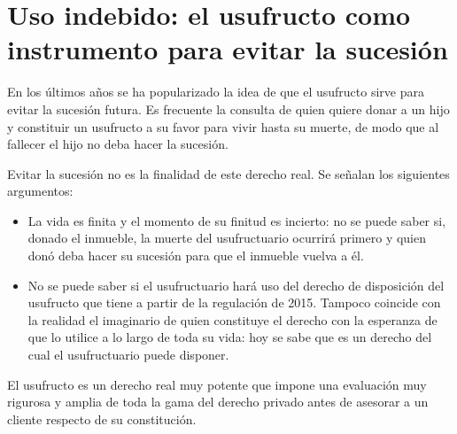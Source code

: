 \documentclass[12pt,oneside]{book}
\begin{document}
\section{Uso indebido: el usufructo como instrumento para evitar la sucesión}

En los últimos años se ha popularizado la idea de que el usufructo sirve para evitar la sucesión futura. Es frecuente la consulta de quien quiere donar a un hijo y constituir un usufructo a su favor para vivir hasta su muerte, de modo que al fallecer el hijo no deba hacer la sucesión.

Evitar la sucesión no es la finalidad de este derecho real. Se señalan los siguientes argumentos:

\begin{itemize}
    \item La vida es finita y el momento de su finitud es incierto: no se puede saber si, donado el inmueble, la muerte del usufructuario ocurrirá primero y quien donó deba hacer su sucesión para que el inmueble vuelva a él.
    \item No se puede saber si el usufructuario hará uso del derecho de disposición del usufructo que tiene a partir de la regulación de 2015. Tampoco coincide con la realidad el imaginario de quien constituye el derecho con la esperanza de que lo utilice a lo largo de toda su vida: hoy se sabe que es un derecho del cual el usufructuario puede disponer.
\end{itemize}

El usufructo es un derecho real muy potente que impone una evaluación muy rigurosa y amplia de toda la gama del derecho privado antes de asesorar a un cliente respecto de su constitución.
\end{document}
